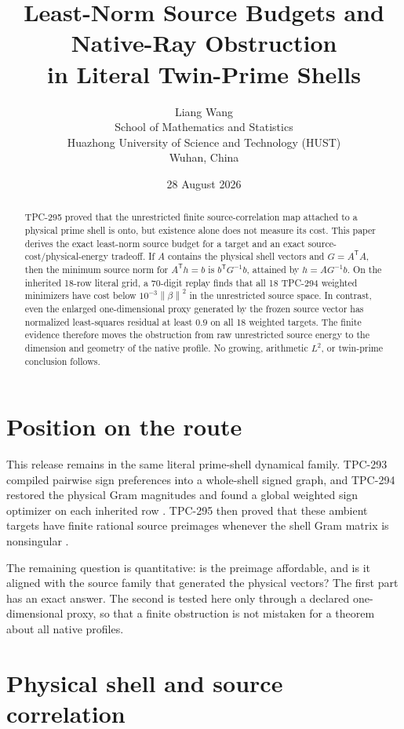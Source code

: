 \documentclass[10pt]{article}
\title{Least-Norm Source Budgets and Native-Ray Obstruction\\
in Literal Twin-Prime Shells}
\author{Liang Wang\\
School of Mathematics and Statistics\\
Huazhong University of Science and Technology (HUST)\\
Wuhan, China}
\date{28 August 2026}
\newcommand{\norm}[1]{\left\lVert #1\right\rVert}
\begin{document}
\maketitle

\begin{abstract}
TPC-295 proved that the unrestricted finite source-correlation map attached
to a physical prime shell is onto, but existence alone does not measure its
cost.  This paper derives the exact least-norm source budget for a target
and an exact source-cost/physical-energy tradeoff.  If $A$ contains the
physical shell vectors and $G=A^{\mathsf T}A$, then the minimum source norm
for $A^{\mathsf T}h=b$ is $b^{\mathsf T}G^{-1}b$, attained by
$h=AG^{-1}b$.  On the inherited 18-row literal grid, a 70-digit replay
finds that all 18 TPC-294 weighted minimizers have cost below
$10^{-3}\norm{\beta}^2$ in the unrestricted source space.  In contrast,
even the enlarged one-dimensional proxy generated by the frozen source
vector has normalized least-squares residual at least $0.9$ on all 18
weighted targets.  The finite evidence therefore moves the obstruction from
raw unrestricted source energy to the dimension and geometry of the native
profile.  No growing, arithmetic $L^2$, or twin-prime conclusion follows.
\end{abstract}

\section{Position on the route}

This release remains in the same literal prime-shell dynamical family.
TPC-293 compiled pairwise sign preferences into a whole-shell signed graph,
and TPC-294 restored the physical Gram magnitudes and found a global
weighted sign optimizer on each inherited row \cite{tpc293,tpc294}.  TPC-295
then proved that these ambient targets have finite rational source
preimages whenever the shell Gram matrix is nonsingular \cite{tpc295}.

The remaining question is quantitative: is the preimage affordable, and is
it aligned with the source family that generated the physical vectors?  The
first part has an exact answer.  The second is tested here only through a
declared one-dimensional proxy, so that a finite obstruction is not
mistaken for a theorem about all native profiles.

\section{Physical shell and source correlation}
\end{document}
